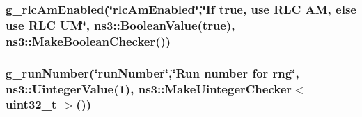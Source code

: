 \subsubsection[{\texorpdfstring{g\+\_\+rlc\+Am\+Enabled}{g_rlcAmEnabled}}]{ g\+\_\+rlc\+Am\+Enabled(\char`\"{}rlc\+Am\+Enabled\char`\"{},\char`\"{}If true, use R\+LC AM, else use R\+LC UM\char`\"{}, ns3\+::\+Boolean\+Value(true), ns3\+::\+Make\+Boolean\+Checker())\hspace{0.3cm}{\ttfamily [static]}}\hypertarget{dce-example-mptcp-mmwave_8cc_ad58c0bca4940ad128156370612451147}{}\label{dce-example-mptcp-mmwave_8cc_ad58c0bca4940ad128156370612451147}
\subsubsection[{\texorpdfstring{g\+\_\+run\+Number}{g_runNumber}}]{ g\+\_\+run\+Number(\char`\"{}run\+Number\char`\"{},\char`\"{}Run number for rng\char`\"{}, ns3\+::\+Uinteger\+Value(1), {\bf ns3\+::\+Make\+Uinteger\+Checker}$<$ uint32\+\_\+t $>$())\hspace{0.3cm}{\ttfamily [static]}}\hypertarget{dce-example-mptcp-mmwave_8cc_ace0dc10c409e349b7e4587be2429e702}{}\label{dce-example-mptcp-mmwave_8cc_ace0dc10c409e349b7e4587be2429e702}
